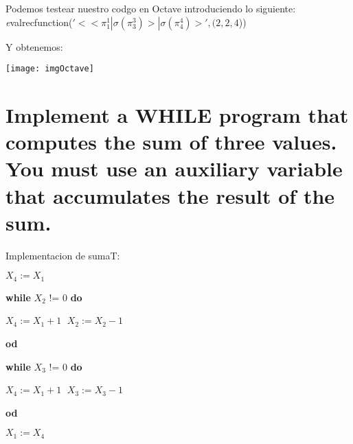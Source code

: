 \documentclass{article}
\begin{document}
	      
Podemos testear nuestro codgo en Octave introduciendo lo siguiente:
\emph evalrecfunction($'<<\pi^1_1|\sigma(\pi^3_3)>|\sigma(\pi^4_4)>', (2,2,4$))

Y obtenemos:


\centering
	\texttt{[image: imgOctave]}
	\flushleft





\section{ Implement  a  WHILE  program  that  computes  the  sum  of  three  values.   You
must use an auxiliary variable that accumulates the result of the sum.}

Implementacion de sumaT:


  $X_4 := X_1\;$
  
  \textbf {while} $X_2$ != 0 \textbf {do}
  
  $X_4 := X_1 +1\;$
  $X_2 := X_2 -1\;$
  
  \textbf {od}
  
  \textbf {while} $X_3$ != 0 \textbf {do}
  
   $X_4 := X_1 +1\;$
  $X_3 := X_3 -1\;$
  
  \textbf {od}
 
  $X_1 := X_4\;$
 
\end{document}
